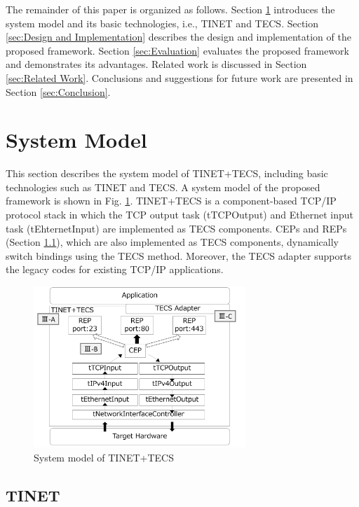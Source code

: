 \documentclass[conference]{IEEEtran/IEEEtran}
\begin{document}
The remainder of this paper is organized as follows.
Section \ref{sec:System Model} introduces the system model and its basic technologies, i.e., TINET and TECS.
Section \ref{sec:Design and Implementation} describes the design and implementation of the proposed framework.
Section \ref{sec:Evaluation} evaluates the proposed framework and demonstrates its advantages.
Related work is discussed in Section \ref{sec:Related Work}.
Conclusions and suggestions for future work are presented in Section \ref{sec:Conclusion}.


\section{System Model}
\label{sec:System Model}

This section describes the system model of TINET+TECS, including basic technologies such as TINET and TECS.
A system model of the proposed framework is shown in Fig. \ref{fig:SystemModel}.
TINET+TECS is a component-based TCP/IP protocol stack in which the TCP output task (tTCPOutput) and Ethernet input task (tEhternetInput) are implemented as TECS components.
CEPs and REPs (Section \ref{sec:TINET}), which are also implemented as TECS components, dynamically switch bindings using the TECS method.
Moreover, the TECS adapter supports the legacy codes for existing TCP/IP applications.

\begin{figure}[t]
    \centering
    \includegraphics[width=8.0cm,clip]{figure/SystemModel.pdf}
    \vspace{-1mm} \caption{System model of TINET+TECS}
    \vspace{-1mm} \label{fig:SystemModel}
\end{figure}

\subsection{TINET}
\label{sec:TINET}
\end{document}
